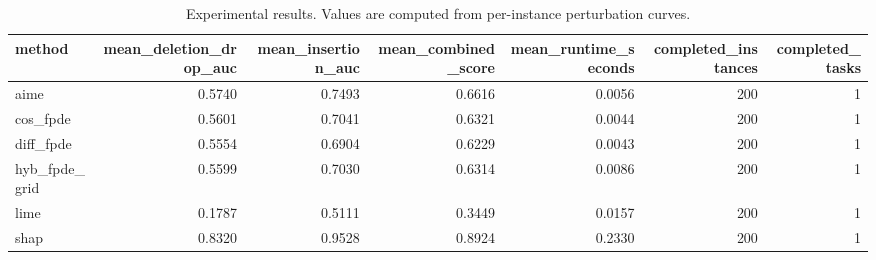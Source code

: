 \begin{table}[t]
\caption{Experimental results. Values are computed from per-instance perturbation curves.}
\label{tab:main_results_computed}
\centering
\begin{tabular}{lrrrrrr}
\toprule
method & mean\_deletion\_drop\_auc & mean\_insertion\_auc & mean\_combined\_score & mean\_runtime\_seconds & completed\_instances & completed\_tasks \\
\midrule
aime & 0.5740 & 0.7493 & 0.6616 & 0.0056 & 200 & 1 \\
cos\_fpde & 0.5601 & 0.7041 & 0.6321 & 0.0044 & 200 & 1 \\
diff\_fpde & 0.5554 & 0.6904 & 0.6229 & 0.0043 & 200 & 1 \\
hyb\_fpde\_grid & 0.5599 & 0.7030 & 0.6314 & 0.0086 & 200 & 1 \\
lime & 0.1787 & 0.5111 & 0.3449 & 0.0157 & 200 & 1 \\
shap & 0.8320 & 0.9528 & 0.8924 & 0.2330 & 200 & 1 \\
\bottomrule
\end{tabular}

\end{table}
